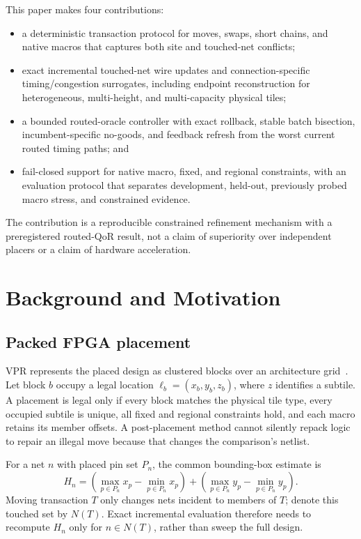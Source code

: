 \documentclass[sigconf,anonymous,review]{acmart}
\newcommand{\vpr}{\textsc{VPR}}
\begin{document}
This paper makes four contributions:
\begin{itemize}
 \item a deterministic transaction protocol for moves, swaps, short chains,
 and native macros that captures both site and touched-net conflicts;
 \item exact incremental touched-net wire updates and connection-specific
 timing/congestion surrogates, including endpoint reconstruction for
 heterogeneous, multi-height, and multi-capacity physical tiles;
 \item a bounded routed-oracle controller with exact rollback, stable batch
 bisection, incumbent-specific no-goods, and feedback refresh from the worst
 current routed timing paths; and
 \item fail-closed support for native macro, fixed, and regional constraints,
 with an evaluation protocol that separates development,
 held-out, previously probed macro stress, and constrained evidence.
\end{itemize}

The contribution is a reproducible constrained refinement mechanism with a
preregistered routed-QoR result, not a claim of superiority over independent
placers or a claim of hardware acceleration.

\section{Background and Motivation}

\subsection{Packed FPGA placement}

\vpr{} represents the placed design as clustered blocks over an architecture
grid~\cite{betz1997vpr,vtr8}.  Let block $b$ occupy a legal location
$\ell_b=(x_b,y_b,z_b)$, where $z$ identifies a subtile.  A placement is legal
only if every block matches the physical tile type, every occupied subtile is
unique, all fixed and regional constraints hold, and each macro retains its
member offsets.  A post-placement method cannot silently repack logic to
repair an illegal move because that changes the comparison's netlist.

For a net $n$ with placed pin set $P_n$, the common bounding-box estimate is
\begin{equation}
 H_n = (\max_{p\in P_n}x_p-\min_{p\in P_n}x_p)
     +(\max_{p\in P_n}y_p-\min_{p\in P_n}y_p).
\end{equation}
Moving transaction $T$ only changes nets incident to members of $T$; denote
this touched set by $N(T)$.  Exact incremental evaluation therefore needs to
recompute $H_n$ only for $n\in N(T)$, rather than sweep the full design.
\end{document}

